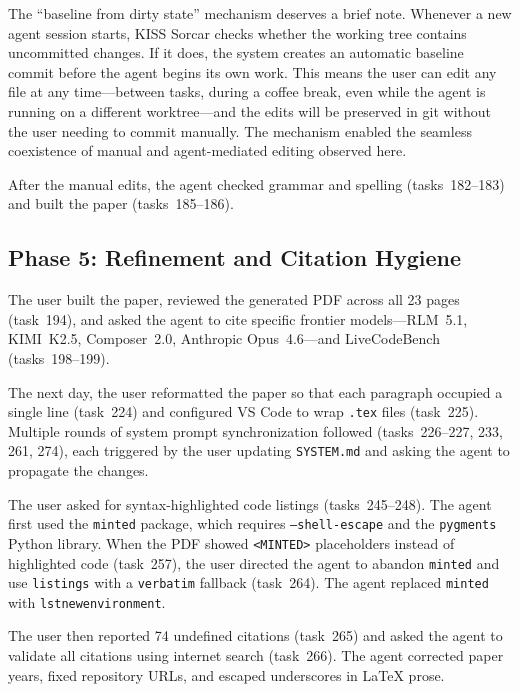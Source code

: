 \documentclass{article}
\begin{document}
The ``baseline from dirty state'' mechanism deserves a brief note.  Whenever a new agent session starts, KISS Sorcar checks whether the working tree contains uncommitted changes.  If it does, the system creates an automatic baseline commit before the agent begins its own work.  This means the user can edit any file at any time---between tasks, during a coffee break, even while the agent is running on a different worktree---and the edits will be preserved in git without the user needing to commit manually.  The mechanism enabled the seamless coexistence of manual and agent-mediated editing observed here.

After the manual edits, the agent checked grammar and spelling (tasks~182--183) and built the paper (tasks~185--186).

\subsection{Phase 5: Refinement and Citation Hygiene}
\label{sec:phase5}

The user built the paper, reviewed the generated PDF across all 23 pages (task~194), and asked the agent to cite specific frontier models---RLM~5.1, KIMI~K2.5, Composer~2.0, Anthropic Opus~4.6---and LiveCodeBench (tasks~198--199).

The next day, the user reformatted the paper so that each paragraph occupied a single line (task~224) and configured VS Code to wrap \texttt{.tex} files (task~225).  Multiple rounds of system prompt synchronization followed (tasks~226--227, 233, 261, 274), each triggered by the user updating \texttt{SYSTEM.md} and asking the agent to propagate the changes.

The user asked for syntax-highlighted code listings (tasks~245--248).  The agent first used the \texttt{minted} package, which requires \texttt{--shell-escape} and the \texttt{pygments} Python library.  When the PDF showed \texttt{<MINTED>} placeholders instead of highlighted code (task~257), the user directed the agent to abandon \texttt{minted} and use \texttt{listings} with a \texttt{verbatim} fallback (task~264).  The agent replaced \texttt{minted} with \texttt{lstnewenvironment}.

The user then reported 74 undefined citations (task~265) and asked the agent to validate all citations using internet search (task~266).  The agent corrected paper years, fixed repository URLs, and escaped underscores in \LaTeX{} prose.
\end{document}
